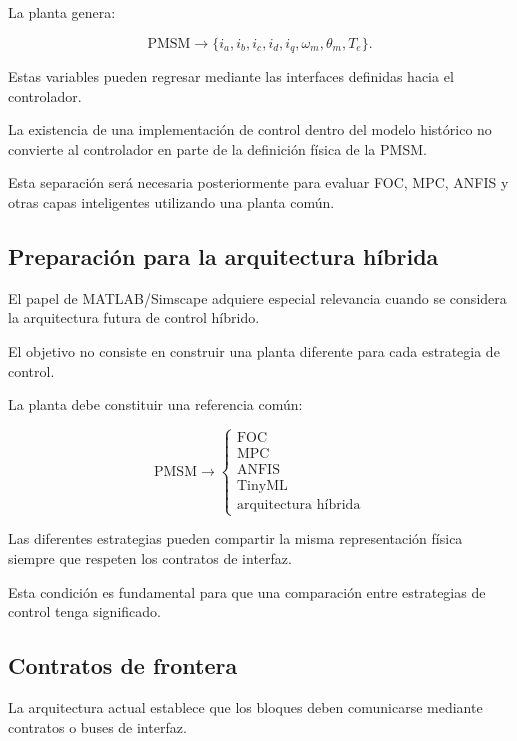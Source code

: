 La planta genera:

\begin{equation}
\text{PMSM}
\rightarrow
\{i_a,i_b,i_c,i_d,i_q,\omega_m,\theta_m,T_e\}.
\end{equation}

Estas variables pueden regresar mediante las interfaces definidas hacia el controlador.

La existencia de una implementación de control dentro del modelo histórico no convierte al controlador en parte de la definición física de la PMSM.

Esta separación será necesaria posteriormente para evaluar FOC, MPC, ANFIS y otras capas inteligentes utilizando una planta común.

\subsection{Preparación para la arquitectura híbrida}

El papel de MATLAB/Simscape adquiere especial relevancia cuando se considera la arquitectura futura de control híbrido.

El objetivo no consiste en construir una planta diferente para cada estrategia de control.

La planta debe constituir una referencia común:

\begin{equation}
\text{PMSM}
\rightarrow
\left\{
\begin{array}{c}
\text{FOC}\\
\text{MPC}\\
\text{ANFIS}\\
\text{TinyML}\\
\text{arquitectura híbrida}
\end{array}
\right.
\end{equation}

Las diferentes estrategias pueden compartir la misma representación física siempre que respeten los contratos de interfaz.

Esta condición es fundamental para que una comparación entre estrategias de control tenga significado.

\subsection{Contratos de frontera}

La arquitectura actual establece que los bloques deben comunicarse mediante contratos o buses de interfaz.


